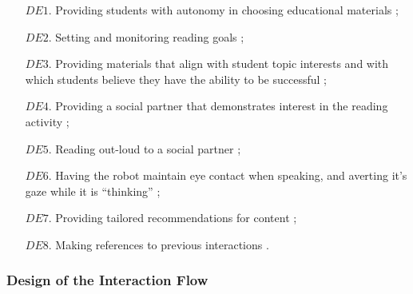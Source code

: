 \documentclass{sigchi}
\begin{document}
\begin{enumerate}[leftmargin=0ex,itemindent=5.85ex,itemsep=0.25ex]

\item[$DE1$.] Providing students with autonomy in choosing educational materials \cite{Jones:2011};
\item[$DE2$.] Setting and monitoring reading goals \cite{Cabral:2015};
\item[$DE3$.] Providing materials that align with student topic interests and with which students believe they have the ability to be successful \cite{Ainley:2002};
\item[$DE4$.] Providing a social partner that demonstrates interest in the reading activity \cite{Sansone:2005};
\item[$DE5$.] Reading out-loud to a social partner \cite{Rasinski:2003};
\item[$DE6$.] Having the robot maintain eye contact when speaking, and averting it's gaze while it is ``thinking'' \cite{Mutlu:2011, Andrist:2014};
\item[$DE7$.] Providing tailored recommendations for content \cite{Lim:2013};
\item[$DE8$.] Making references to previous interactions \cite{Leite:2009}. 
\end{enumerate}



\subsubsection{Design of the Interaction Flow}
\end{document}
